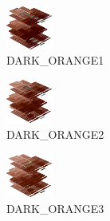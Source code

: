 \hspace{0.1cm}
\begin{minipage}[b]{0.15\linewidth}
\begin{figure}[H]                                                          
  \centering                                                             
  \begin{adjustbox}{width=1.5cm,center}                                   
  \includegraphics[width=1.5cm]{src/colorspace_colourflow/flows/colourflow_49-45.png}%
  \end{adjustbox}                                                        
\caption*{DARK\_ORANGE1}                                           
\end{figure}                                                               
\end{minipage}
\hspace{0.1cm}
\begin{minipage}[b]{0.15\linewidth}
\begin{figure}[H]                                                          
  \centering                                                             
  \begin{adjustbox}{width=1.5cm,center}                                   
  \includegraphics[width=1.5cm]{src/colorspace_colourflow/flows/colourflow_50-45.png}%
  \end{adjustbox}                                                        
\caption*{DARK\_ORANGE2}                                           
\end{figure}                                                               
\end{minipage}
\hspace{0.1cm}
\begin{minipage}[b]{0.15\linewidth}
\begin{figure}[H]                                                          
  \centering                                                             
  \begin{adjustbox}{width=1.5cm,center}                                   
  \includegraphics[width=1.5cm]{src/colorspace_colourflow/flows/colourflow_51-45.png}%
  \end{adjustbox}                                                        
\caption*{DARK\_ORANGE3}                                           
\end{figure}                                                               
\end{minipage}
